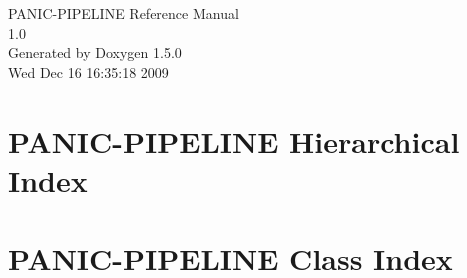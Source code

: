 \documentclass[a4paper]{book}
\begin{document}
\begin{titlepage}
\vspace*{7cm}
\begin{center}
{\Large PANIC-PIPELINE Reference Manual\\[1ex]\large 1.0 }\\
\vspace*{1cm}
{\large Generated by Doxygen 1.5.0}\\
\vspace*{0.5cm}
{\small Wed Dec 16 16:35:18 2009}\\
\end{center}
\end{titlepage}
\clearemptydoublepage
{}
\tableofcontents
\clearemptydoublepage
{}
\chapter{PANIC-PIPELINE Hierarchical Index}

\chapter{PANIC-PIPELINE Class Index}

\end{document}
